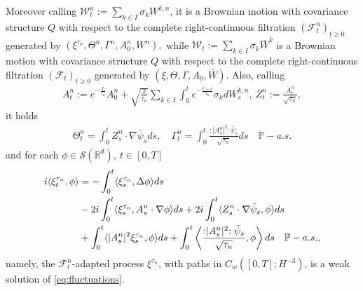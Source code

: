 \documentclass[a4paper,10pt]{amsart}
\newcommand{\R}{\mathbb{R}}
\newcommand{\wick}[1]{:\mathrel{#1}:}
\theoremstyle{remark}
\numberwithin{equation}{section}
\begin{document}
Moreover calling $\mathcal{W}^n_t:=\sum_{k\in I}\sigma_k W^{k,n}$, it is a Brownian motion with covariance structure $Q$ with respect to the complete right-continuous filtration $(\mathcal{F}^n_t)_{t\geq 0}$ generated by $(\xi^{\tau_n},\Theta^n, \Gamma^n, A^{n}_0,W^n),$ while $\mathcal{W}_t:=\sum_{k\in I}\sigma_k \bar{W}^{k}$ is a Brownian motion with covariance structure $Q$ with respect to the complete right-continuous filtration $(\mathcal{F}_t)_{t\geq 0}$ generated by $(\xi,\Theta, \Gamma, A_0,\bar{W}).$
Also, calling
\begin{align*}
    A^{n}_t:=e^{-\frac{t}{\tau_n}}A_0^{n}+\sqrt{\frac{2}{\tau_n}}\sum_{k\in I}\int_0^t e^{-\frac{t-s}{\tau_n}}\sigma_k dW^{k,n}_s,\ Z^n_t:=\frac{A^{n}_t}{\sqrt{\tau_n}},
\end{align*}
it holds
\begin{align} \label{eq:TG_n}
    \Theta^n_t=\int_0^t  Z^n_s\cdot\nabla\bar{\psi}_s ds,\quad \Gamma^n_t=\int_0^t  \frac{\wick{|A^n_s|^2}\bar{\psi}_s}{\sqrt{\tau_n}} ds\quad \mathbb{P}-a.s.
\end{align}
and for each $\phi\in \mathscr{S}(\R^d),\ t\in [0,T]$ 
   \begin{align}\label{eq:weak_formulation_changed_space_prelimit}
       i\langle \xi^{\tau_n}_t,\phi\rangle&=-\int_0^t \langle\xi^{\tau_n}_s, \Delta\phi\rangle ds\notag\\ &-2i\int_0^t\langle \xi^{\tau_n}_s,A^{n}_s\cdot\nabla\phi\rangle ds+2i\int_0^t\langle Z^{n}_s\cdot\nabla\bar{\psi}_s,\phi\rangle ds\notag\\ &+\int_0^t \langle|A^{n}_s|^2 \xi^{\tau_n}_s, \phi\rangle ds+\int_0^t \left\langle\frac{\wick{|A^n_s|^2}\bar{\psi}_s}{\sqrt{\tau_n}}, \phi\right\rangle ds\quad \mathbb{P}-a.s.,
   \end{align}
namely, the $\mathcal{F}^n_t$-adapted process $\xi^{\tau_n}$, with paths in
$C_w([0,T];H^{-3})$, is a weak solution of
\eqref{eq:fluctuations}.
\end{document}
